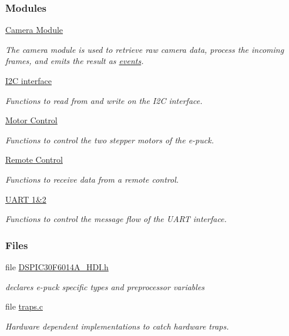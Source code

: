 \subsubsection*{Modules}
\begin{DoxyCompactItemize}
\item 
\hyperlink{group__camera}{Camera Module}
\begin{DoxyCompactList}\small\item\em The camera module is used to retrieve raw camera data, process the incoming frames, and emits the result as \hyperlink{group__events}{events}. \end{DoxyCompactList}\item 
\hyperlink{group__i2c}{I2\+C interface}
\begin{DoxyCompactList}\small\item\em Functions to read from and write on the I2\+C interface. \end{DoxyCompactList}\item 
\hyperlink{group__motors}{Motor Control}
\begin{DoxyCompactList}\small\item\em Functions to control the two stepper motors of the e-\/puck. \end{DoxyCompactList}\item 
\hyperlink{group__remotecontrol}{Remote Control}
\begin{DoxyCompactList}\small\item\em Functions to receive data from a remote control. \end{DoxyCompactList}\item 
\hyperlink{group__uart}{U\+A\+R\+T 1\&2}
\begin{DoxyCompactList}\small\item\em Functions to control the message flow of the U\+A\+R\+T interface. \end{DoxyCompactList}\end{DoxyCompactItemize}
\subsubsection*{Files}
\begin{DoxyCompactItemize}
\item 
file \hyperlink{DSPIC30F6014A__HDI_8h}{D\+S\+P\+I\+C30\+F6014\+A\+\_\+\+H\+D\+I.\+h}
\begin{DoxyCompactList}\small\item\em declares e-\/puck specific types and preprocessor variables \end{DoxyCompactList}\item 
file \hyperlink{traps_8c}{traps.\+c}
\begin{DoxyCompactList}\small\item\em Hardware dependent implementations to catch hardware traps. \end{DoxyCompactList}\end{DoxyCompactItemize}


